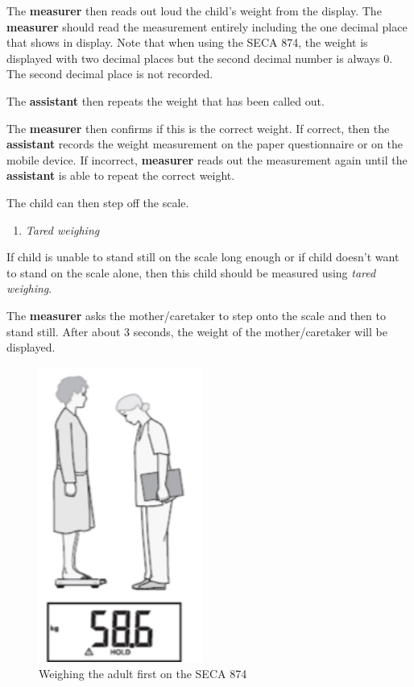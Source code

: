 \documentclass[12pt,]{book}
\providecommand{\tightlist}{%
  \setlength{\itemsep}{0pt}\setlength{\parskip}{0pt}}
\begin{document}
The \textbf{measurer} then reads out loud the child's weight from the
display. The \textbf{measurer} should read the measurement entirely
including the one decimal place that shows in display. Note that when
using the SECA 874, the weight is displayed with two decimal places but
the second decimal number is always 0. The second decimal place is not
recorded.

The \textbf{assistant} then repeats the weight that has been called out.

The \textbf{measurer} then confirms if this is the correct weight. If
correct, then the \textbf{assistant} records the weight measurement on
the paper questionnaire or on the mobile device. If incorrect,
\textbf{measurer} reads out the measurement again until the
\textbf{assistant} is able to repeat the correct weight.

The child can then step off the scale.

\begin{enumerate}
\def\labelenumi{\alph{enumi}.}
\setcounter{enumi}{1}
\tightlist
\item
  \emph{Tared weighing}
\end{enumerate}

If child is unable to stand still on the scale long enough or if child
doesn't want to stand on the scale alone, then this child should be
measured using \emph{tared weighing}.

The \textbf{measurer} asks the mother/caretaker to step onto the scale
and then to stand still. After about 3 seconds, the weight of the
mother/caretaker will be displayed.

\begin{figure}

{\centering \includegraphics[width=2.11in]{images/seca874adult} 

}

\caption{Weighing the adult first on the SECA 874}\label{fig:unnamed-chunk-9}
\end{figure}
\end{document}
